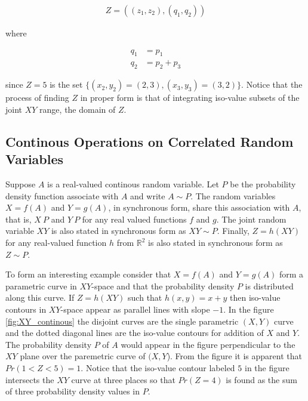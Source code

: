 \begin{align*}
Z = ((z_1, z_2), (q_1, q_2))
\end{align*}

where

\begin{align*}
q_1 &= p_1\\
q_2 &= p_2 + p_3
\end{align*}

since $Z = 5$ is the set $\{(x_2,y_2) = (2,3), (x_3, y_3) = (3,2)\}$. Notice that the process of finding $Z$ in proper form is that of integrating iso-value subsets of the joint $XY$ range, the domain of $Z$. 

\subsection{Continous Operations on Correlated Random Variables}

Suppose $A$ is a real-valued continous random variable. Let $P$ be the probability density function associate with $A$ and write $A \sim P$. The random variables $X = f(A)$ and $Y = g(A)$, in synchronous form, share this association with $A$, that is, $X ~ P$ and $Y ~ P$ for any real valued functions $f$ and $g$. The joint random variable $XY$ is also stated in synchronous form as $XY \sim P$. Finally, $Z = h(XY)$ for any real-valued function $h$ from $\mathbb{R}^2$ is also stated in synchronous form as $Z \sim P$. 

To form an interesting example consider that $X = f(A)$ and $Y = g(A)$ form a parametric curve in $XY$-space and that the probability density $P$ is distributed along this curve. If $Z = h(XY)$ such that $h(x,y) = x+y$ then iso-value contours in $XY$-space appear as parallel lines with slope $-1$. In the figure \ref{fig:XY_continous} the disjoint curves are the single parametric $(X,Y)$ curve and the dotted diagonal lines are the iso-value contours for addition of $X$ and $Y$. The probability density $P$ of $A$ would appear in the figure perpendicular to the $XY$ plane over the paremetric curve of $(X,Y$). From the figure it is apparent that $Pr(1 < Z < 5) = 1$. Notice that the iso-value contour labeled $5$ in the figure intersects the $XY$ curve at three places so that $Pr(Z = 4)$ is found as the sum of three probability density values in $P$. 

